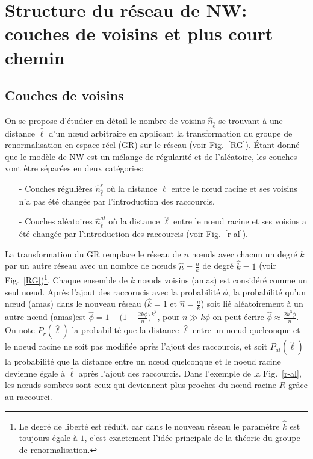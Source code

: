 \section{Structure du réseau de NW: couches de voisins et plus court chemin }

\subsection{Couches de voisins}
On se propose d'étudier en détail le nombre de voisins  $\hat{n}_{\hat{\ell}}$ se trouvant  à une distance $\hat{\ell}$ d'un nœud arbitraire en applicant la transformation du groupe de renormalisation en espace réel (GR) sur le réseau (voir Fig.~\ref{RG}). \'{E}tant donné que le modèle de NW est un mélange de régularité et de l'aléatoire, les couches vont être séparées en deux catégories: 
\begin{itemize}
\item[-] Couches régulières $\hat{n}_{\hat{\ell}}^r$ où la distance $\hat{\ell}$ entre le nœud racine et ses voisins n'a pas été changée par l'introduction des raccourcis.
\item [-] Couches aléatoires $\hat{n}_{\hat{\ell}}^{al}$ où la distance $\hat{\ell}$ entre le nœud racine et ses voisins a été changée par l'introduction des raccourcis (voir Fig.~\ref{r-al}).
\end{itemize}
La transformation du GR remplace le réseau de $n$ nœuds avec chacun un degré $k$ par un autre réseau avec un nombre de nœuds {$\hat{n}$}$=\frac{n}{k}$ de degré $\hat{k}=1$
(voir Fig.~\ref{RG})\footnote{Le degré de liberté est réduit, car dans le nouveau réseau le paramètre  $\hat{k}$  est toujours égale à $1$, c'est exactement l'idée principale de la théorie du groupe de renormalisation.}. Chaque ensemble de $k$ nœuds voisins (\textsf{amas}) est considéré comme un seul nœud. Après l'ajout des raccorucis avec la probabilité $\phi$, la probabilité qu'un nœud (\textsf{amas}) dans le nouveau réseau ($\hat{k}=1$ et $\hat{n}=\frac{n}{k}$) soit lié aléatoirement à un autre nœud (\textsf{amas})est $\hat{\phi}=1-\big(1-\frac{2k\phi}{n}\big)^{k^2}$, pour $n\gg k\phi$ on peut écrire $\hat{\phi}\approx \frac{2k^3\phi}{n}$. On note $P_r(\hat{\ell})$ la probabilité que la distance $\hat{\ell}$ entre un nœud quelconque et le noeud racine ne soit pas modifiée après l'ajout des raccourcis, et soit $P_{al}(\hat{\ell})$ la probabilité que la distance entre un nœud quelconque et le noeud racine devienne égale à $\hat{\ell}$ après l'ajout des raccourcis. Dans l'exemple de la Fig.~\ref{r-al}, les nœuds sombres sont ceux qui deviennent plus proches du nœud racine $R$ grâce au raccourci.\\ 
